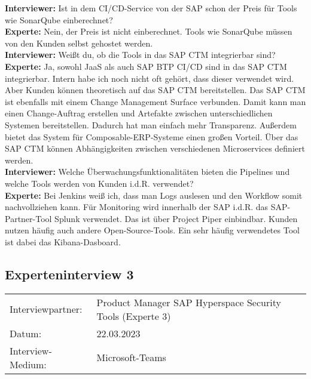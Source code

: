 \begin{linenumbers}
    \textbf{Interviewer:} Ist in dem CI/CD-Service von der SAP schon der Preis für Tools wie SonarQube einberechnet?\\
    \textbf{Experte:} Nein, der Preis ist nicht einberechnet. Tools wie SonarQube müssen von den Kunden selbst gehostet werden.\\
    \textbf{Interviewer:} Weißt du, ob die Tools in das SAP CTM integrierbar sind?\\
    \textbf{Experte:} Ja, sowohl JaaS als auch SAP BTP CI/CD sind in das SAP CTM integrierbar. Intern habe ich noch nicht oft gehört, dass dieser verwendet wird. Aber Kunden können theoretisch auf das SAP CTM bereitstellen. Das SAP CTM ist ebenfalls mit einem Change Management Surface verbunden. Damit kann man einen Change-Auftrag erstellen und Artefakte zwischen unterschiedlichen Systemen bereitstellen. Dadurch hat man einfach mehr Transparenz. Außerdem bietet das System für Composable-ERP-Systeme einen großen Vorteil. Über das SAP CTM können Abhängigkeiten zwischen verschiedenen Microservices definiert werden.\\
    \textbf{Interviewer:} Welche Überwachungsfunktionalitäten bieten die Pipelines und welche Tools werden von Kunden i.d.R. verwendet?\\
    \textbf{Experte:} Bei Jenkins weiß ich, dass man Logs auslesen und den Workflow somit nachvollziehen kann. Für Monitoring wird innerhalb der SAP i.d.R. das SAP-Partner-Tool Splunk verwendet. Das ist über Project Piper einbindbar. Kunden nutzen häufig auch andere Open-Source-Tools. Ein sehr häufig verwendetes Tool ist dabei das Kibana-Dasboard.
\end{linenumbers}
\newpage
\resetlinenumber
\subsection{Experteninterview 3}
	\begin{tabular}{ l l }
		Interviewpartner: & Product Manager SAP Hyperspace Security Tools (Experte 3)\\
		Datum: & 22.03.2023\\
		Interview-Medium: & Microsoft-Teams\\
\end{tabular}\\\\

